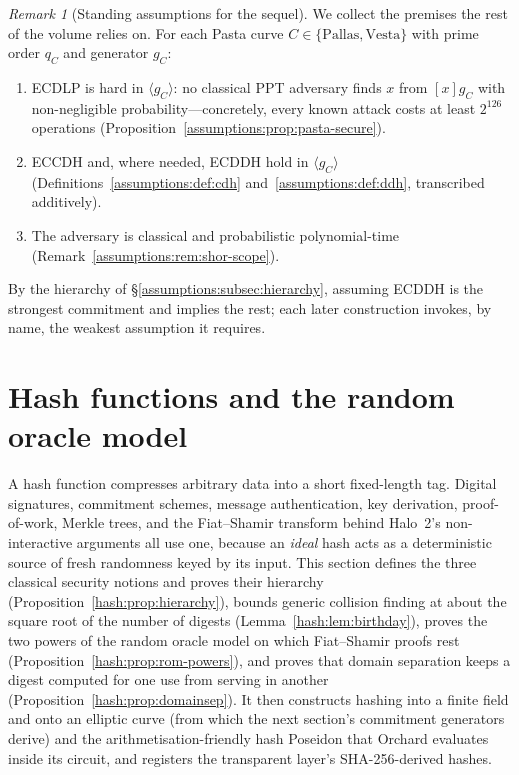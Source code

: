 \documentclass[11pt,a4paper]{article}
\theoremstyle{definition}
\theoremstyle{remark}
\newtheorem{remark}[theorem]{Remark}
\begin{document}
\begin{remark}[Standing assumptions for the sequel]
\label{assumptions:rem:standing}
We collect the premises the rest of the volume relies on. For each
Pasta curve \(C \in \{\mathrm{Pallas}, \mathrm{Vesta}\}\) with prime
order \(q_C\) and generator \(g_C\):
\begin{enumerate}
\item ECDLP is hard in \(\langle g_C \rangle\): no classical PPT
  adversary finds \(x\) from \([x]g_C\) with non-negligible
  probability---concretely, every known attack costs at least
  \(2^{126}\) operations
  (Proposition~\ref{assumptions:prop:pasta-secure}).
\item ECCDH and, where needed, ECDDH hold in \(\langle g_C \rangle\)
  (Definitions~\ref{assumptions:def:cdh}
  and~\ref{assumptions:def:ddh}, transcribed additively).
\item The adversary is classical and probabilistic polynomial-time
  (Remark~\ref{assumptions:rem:shor-scope}).
\end{enumerate}
By the hierarchy of \S\ref{assumptions:subsec:hierarchy}, assuming
ECDDH is the strongest commitment and implies the rest; each later
construction invokes, by name, the weakest assumption it requires.
\end{remark}

\section{Hash functions and the random oracle model}\label{sec:hash}

A hash function compresses arbitrary data into a short fixed-length
tag. Digital signatures, commitment schemes, message authentication,
key derivation, proof-of-work, Merkle trees, and the Fiat--Shamir
transform behind Halo~2's non-interactive arguments all use one,
because an \emph{ideal} hash acts as a deterministic source of fresh
randomness keyed by its input. This section defines the three
classical security notions and proves their hierarchy
(Proposition~\ref{hash:prop:hierarchy}), bounds generic collision
finding at about the square root of the number of digests
(Lemma~\ref{hash:lem:birthday}), proves the two powers of the random
oracle model on which Fiat--Shamir proofs rest
(Proposition~\ref{hash:prop:rom-powers}), and proves that domain
separation keeps a digest computed for one use from serving in another
(Proposition~\ref{hash:prop:domainsep}). It then constructs hashing
into a finite field and onto an elliptic curve (from which the next
section's commitment generators derive) and the
arithmetisation-friendly hash Poseidon that Orchard evaluates inside
its circuit, and registers the transparent layer's SHA-256-derived
hashes.
\end{document}
